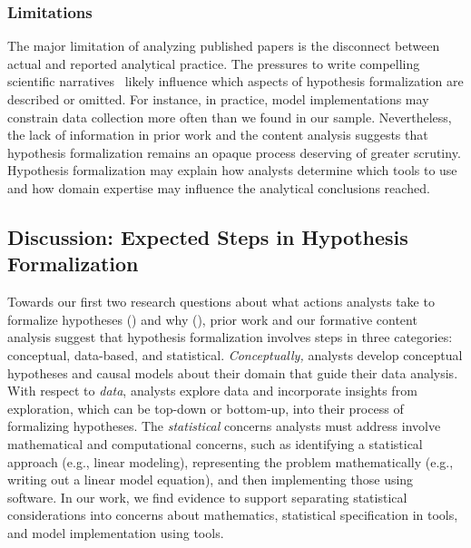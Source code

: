 \subsubsection{Limitations}
The major limitation of analyzing published papers is the disconnect between
actual and reported analytical practice. The pressures to write compelling
scientific narratives~\cite{kerr1998harking} likely influence which aspects of
hypothesis formalization are described or omitted. For instance, in practice, model
implementations may constrain data collection more often than we found in our
sample. Nevertheless, the lack of information in prior work and the content
analysis suggests that hypothesis formalization remains an opaque process
deserving of greater scrutiny. Hypothesis formalization may explain how analysts
determine which tools to use and how domain expertise may influence the analytical conclusions reached. 

\subsection{Discussion: Expected Steps in Hypothesis Formalization}
Towards our first two research questions about what actions analysts take to
formalize hypotheses (\rqSteps) and why (\rqProcess), prior work and our
formative content analysis suggest that hypothesis formalization involves steps
in three categories: conceptual, data-based, and statistical.
\textit{Conceptually,} analysts develop conceptual hypotheses and causal models
about their domain that guide their data analysis. With respect to
\textit{data}, analysts explore data and incorporate insights from exploration,
which can be top-down or bottom-up, into their process of formalizing
hypotheses. The \textit{statistical} concerns analysts must address involve
mathematical and computational concerns, such as identifying a statistical
approach (e.g., linear modeling), representing the problem mathematically (e.g.,
writing out a linear model equation), and then implementing those using
software. In our work, we find evidence to support separating statistical
considerations into concerns about mathematics, statistical specification in
tools, and model implementation using tools.

